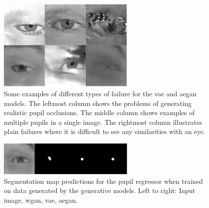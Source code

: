 \begin{figure}[t]
    \centering
    \includegraphics[width=0.6\textwidth]{images/misc/failure_modes_VAE_AEGAN.png}
    \caption{Some examples of different types of failure for the \acrshort{vae} and \acrshort{aegan} models. The leftmost column shows the problems of generating realistic pupil occlusions. The middle column shows examples of multiple pupils in a single image. The rightmost column illustrates plain failures where it is difficult to see any similarities with an eye.}
    \label{fig:failures}
\end{figure}

\begin{figure}[t]
    \centering
    \includegraphics[width=0.6\textwidth]{images/misc/segmentation_prediction.png}
    \caption{Segmentation map predictions for the pupil regressor when trained on data generated by the generative models. Left to right: Input image, \acrshort{wgan}, \acrshort{vae}, \acrshort{aegan}.}
    \label{fig:segmentpredict}
\end{figure}

